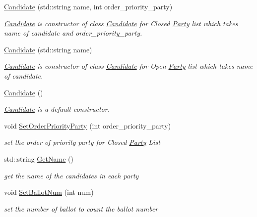\begin{DoxyCompactItemize}
\item 
\hyperlink{classCandidate_a8d4f237094b44cadffade76995daa553}{Candidate} (std\+::string name, int order\+\_\+priority\+\_\+party)
\begin{DoxyCompactList}\small\item\em \hyperlink{classCandidate}{Candidate} is constructor of class \hyperlink{classCandidate}{Candidate} for Closed \hyperlink{classParty}{Party} list which takes name of candidate and order\+\_\+priority\+\_\+party. \end{DoxyCompactList}\item 
\hyperlink{classCandidate_a99c1eda1eeecf4bbd054049449954c90}{Candidate} (std\+::string name)
\begin{DoxyCompactList}\small\item\em \hyperlink{classCandidate}{Candidate} is constructor of class \hyperlink{classCandidate}{Candidate} for Open \hyperlink{classParty}{Party} list which takes name of candidate. \end{DoxyCompactList}\item 
\hyperlink{classCandidate_aa2747741fb662af5e8f3d01d1d1a43b6}{Candidate} ()
\begin{DoxyCompactList}\small\item\em \hyperlink{classCandidate}{Candidate} is a default constructor. \end{DoxyCompactList}\item 
void \hyperlink{classCandidate_a7007f43ce1b34fa18e382708b65b3505}{Set\+Order\+Priority\+Party} (int order\+\_\+priority\+\_\+party)
\begin{DoxyCompactList}\small\item\em set the order of priority party for Closed \hyperlink{classParty}{Party} List \end{DoxyCompactList}\item 
std\+::string \hyperlink{classCandidate_ad97f7ac3672bab8b72b7b7755fa10e0e}{Get\+Name} ()
\begin{DoxyCompactList}\small\item\em get the name of the candidates in each party \end{DoxyCompactList}\item 
void \hyperlink{classCandidate_a0cfc3de32eb64ec8c6f871120f3e971d}{Set\+Ballot\+Num} (int num)
\begin{DoxyCompactList}\small\item\em set the number of ballot to count the ballot number \end{DoxyCompactList}\item 

\end{DoxyCompactItemize}
